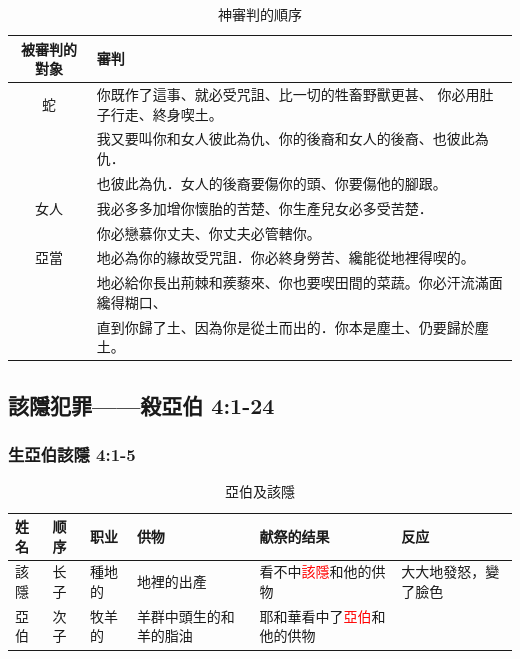 \begin{table}[!hbp]
\centering
\begin{tabular}{|c|l|     }
\hline
\hline
被審判的對象   & 審判                     \\\hline
蛇       & 你既作了這事、就必受咒詛、比一切的牲畜野獸更甚、
           你必用肚子行走、終身喫土。        \\\hline
           & 我又要叫你和女人彼此為仇、你的後裔和女人的後裔、也彼此為仇．\\
           & 也彼此為仇．女人的後裔要傷你的頭、你要傷他的腳跟。\\\hline
女人       &我必多多加增你懷胎的苦楚、你生產兒女必多受苦楚．\\
&你必戀慕你丈夫、你丈夫必管轄你。\\\hline
亞當 & 地必為你的緣故受咒詛．你必終身勞苦、纔能從地裡得喫的。\\
& 地必給你長出荊棘和蒺藜來、你也要喫田間的菜蔬。你必汗流滿面纔得糊口、\\
& 直到你歸了土、因為你是從土而出的．你本是塵土、仍要歸於塵土。\\\hline
\end{tabular}
\caption{神審判的順序}
\end{table}
\fi


\subsection{該隱犯罪——殺亞伯 4:1-24 }
\subsubsection{生亞伯該隱 4:1-5 }
\begin{table}[H]
\centering
\begin{tabular}{|l|l|l|l|l|l| }
\hline
姓名 & 顺序     &    职业 &    供物  &献祭的结果  &反应   \\\hline
該隱 &长子     &種地的  &地裡的出產&看不中\textcolor{red}{該隱}和他的供物  
&大大地發怒，變了臉色 \\\hline
亞伯&次子  &牧羊的 & 羊群中頭生的和羊的脂油&耶和華看中了\textcolor{red}{亞伯}和他的供物& \\\hline
\end{tabular}
\caption{亞伯及該隱}
\end{table}

